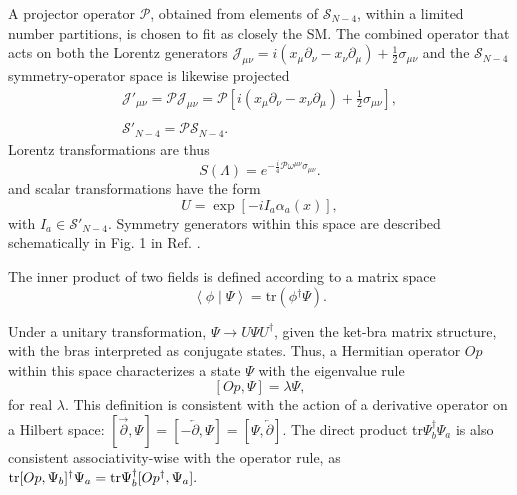 \documentclass[12pt]{article}
\renewcommand\[{\begin{dmath}}
\renewcommand\]{\end{dmath}}
\begin{document}

A  projector operator $\mathcal{P}$,
obtained from elements of $ \mathcal{S}_{N-4}$,  within a limited number partitions, is  chosen  to fit as closely the SM. The combined operator that  acts
on both the Lorentz generators $\mathcal{J}_{\mu\nu}=i\left(x_{\mu}\partial_{\nu}-x_{\nu}\partial_{\mu}\right)+\frac{1}{2}\sigma_{\mu\nu}$
and the $\mathcal{S}_{N-4}$ symmetry-operator space
is likewise projected
\begin{equation}
\begin{array}{c}
\mathcal{J}'_{\mu\nu}=\mathcal{P}\mathcal{J}_{\mu\nu}=\mathcal{P}\left[i\left(x_{\mu}\partial_{\nu}-x_{\nu}\partial_{\mu}\right)+\frac{1}{2}\sigma_{\mu\nu}\right],\\
\\
 \mathcal{S}'_{N-4}=\mathcal{P}\mathcal{S}_{N-4}.
\end{array}  \label{Project}
\end{equation}
Lorentz  transformations are thus
\noindent
\begin{equation}
S(\Lambda)=e^{-\frac{i}{4}{\mathcal{P}}\omega^{\mu\nu}\sigma_{\mu\nu}}.\label{LorentzTransfo}
\end{equation}
and
scalar transformations  have the  form
\begin{equation}
U=\exp\left[-iI_{a}\alpha_{a}(x)\right],\label{ScalarTransfo}
\end{equation}
 with $I_{a} \in  \mathcal{S}'_{N-4} $.
Symmetry generators within this space are described schematically in Fig. 1  in Ref. \cite{Romero}.

The inner product of two fields is defined according to a matrix space
\begin{equation}
\left\langle \phi\mid\Psi\right\rangle =\text{tr}\left(\phi{}^{\dagger}\Psi\right).\label{eq:6-1}
\end{equation}


 Under a unitary transformation,  $\Psi\rightarrow U \Psi U^\dagger$,
given the ket-bra matrix structure\cite{BesproRicardo}, with the bras  interpreted as conjugate states.
Thus,  a Hermitian operator $Op$ within this space  characterizes a state  $\Psi$ with the eigenvalue rule
\begin{equation}\label{eq:6}
[Op,\Psi]=\lambda  \Psi , \end{equation}
for real $\lambda$.
This definition is consistent with the action of a derivative operator on a Hilbert space:
 $[\overrightarrow{\partial},\Psi]=[-\overleftarrow{\partial},\Psi]=[\Psi, \overleftarrow{\partial}]$.
The direct product   tr$\Psi_b^\dagger\Psi_a$ is also  consistent associativity-wise with the operator rule,
as   ${\rm tr }[Op,\Psi_b]^\dagger \Psi _a={\rm tr } \Psi^\dagger_b[ Op^\dagger,\Psi_a ]. $
\end{document}
